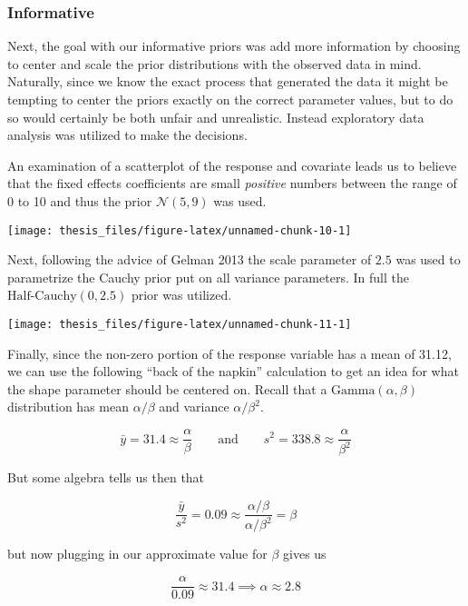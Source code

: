 \documentclass[12pt,twoside]{reedthesis}
\begin{document}
\hypertarget{informative}{%
\subsubsection{Informative}\label{informative}}

Next, the goal with our informative priors was add more information by choosing to center and scale the prior distributions with the observed data in mind. Naturally, since we know the exact process that generated the data it might be tempting to center the priors exactly on the correct parameter values, but to do so would certainly be both unfair and unrealistic. Instead exploratory data analysis was utilized to make the decisions.

An examination of a scatterplot of the response and covariate leads us to believe that the fixed effects coefficients are small \emph{positive} numbers between the range of 0 to 10 and thus the prior \(\mathcal{N}(5, 9)\) was used.
\begin{center}\texttt{[image: thesis\_files/figure-latex/unnamed-chunk-10-1]} \end{center}

Next, following the advice of Gelman 2013 the scale parameter of \(2.5\) was used to parametrize the Cauchy prior put on all variance parameters. In full the \(\text{Half-Cauchy}(0, 2.5)\) prior was utilized.
\begin{center}\texttt{[image: thesis\_files/figure-latex/unnamed-chunk-11-1]} \end{center}

Finally, since the non-zero portion of the response variable has a mean of 31.12, we can use the following ``back of the napkin'' calculation to get an idea for what the shape parameter should be centered on. Recall that a \(\text{Gamma}(\alpha, \beta)\) distribution has mean \(\alpha / \beta\) and variance \(\alpha / \beta^2\).

\[
\bar{y} = 31.4 \approx \frac{\alpha}{\beta}\qquad \text{and} \qquad s^2 = 338.8 \approx \frac{\alpha}{\beta^2}
\]

But some algebra tells us then that

\[
\frac{\bar{y}}{s^2} = 0.09 \approx \frac{\alpha / \beta}{\alpha / \beta^2} = \beta 
\]

but now plugging in our approximate value for \(\beta\) gives us

\[
\frac{\alpha}{0.09} \approx 31.4 \implies \alpha \approx 2.8
\]
\end{document}
